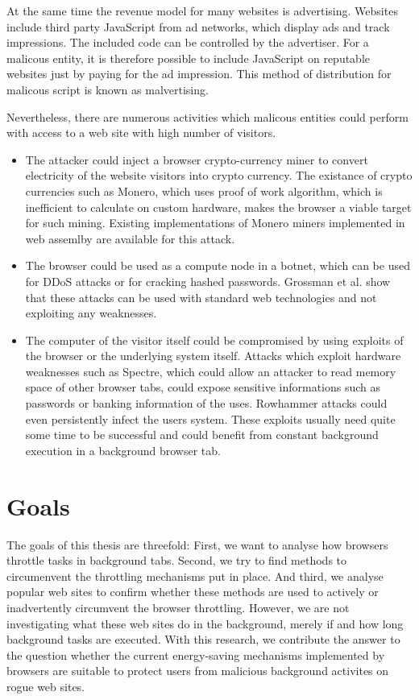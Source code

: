 \documentclass[
	ruledheaders=section,%
	class=report,%
	thesis={type=bachelor},%
	accentcolor=9c,%
	custommargins=true,%
	marginpar=false,%
	parskip=half-,%
	fontsize=11pt,%
]{tudapub}
\begin{document}
  At the same time the revenue model for many websites is advertising. Websites include third party JavaScript from ad networks, which display ads and track impressions. The included code can be controlled by the advertiser. For a malicous entity, it is therefore possible to include JavaScript on reputable websites just by paying for the ad impression. This method of distribution for malicous script is known as malvertising\cite{wiki:malvertising}.
 

  Nevertheless, there are numerous activities which malicous entities could perform with access to a web site with high number of visitors.

  \begin{itemize}
  \item The attacker could inject a browser crypto-currency miner to convert electricity of the website visitors into crypto currency. The existance of crypto currencies such as Monero, which uses proof of work algorithm, which is inefficient to calculate on custom hardware, makes the browser a viable target for such mining. Existing implementations of Monero miners implemented in web assemlby are available for this attack.
  \item The browser could be used as a compute node in a botnet, which can be used for DDoS attacks or for cracking hashed passwords. Grossman et al.\cite{grossmann2013million} show that these attacks can be used with standard web technologies and not exploiting any weaknesses.
  \item The computer of the visitor itself could be compromised by using exploits of the browser or the underlying system itself. Attacks which exploit hardware weaknesses such as Spectre\cite{Kocher2018spectre}, which could allow an attacker to read memory space of other browser tabs, could expose sensitive informations such as passwords or banking information of the uses. Rowhammer\cite{rowhammer} attacks could even persistently infect the users system. These exploits usually need quite some time to be successful and could benefit from constant background execution in a background browser tab.
  \end{itemize}

  \section{Goals}

  The goals of this thesis are threefold: First, we want to analyse how browsers throttle tasks in background tabs. Second, we try to find methods to circumenvent the throttling mechanisms put in place. And third, we analyse popular web sites to confirm whether these methods are used to actively or inadvertently circumvent the browser throttling. However, we are not investigating what these web sites do in the background, merely if and how long background tasks are executed. With this research, we contribute the answer to the question whether the current energy-saving mechanisms implemented by browsers are suitable to protect users from malicious background activites on rogue web sites.
\end{document}
